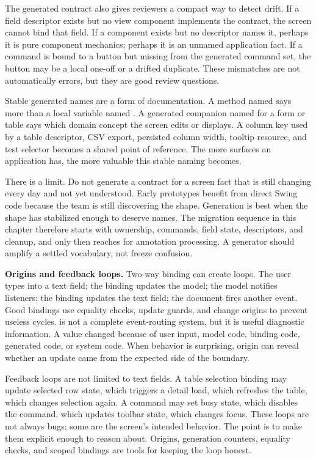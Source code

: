 The generated contract also gives reviewers a compact way to detect drift. If a field descriptor exists but no view component implements the contract, the screen cannot bind that field. If a component exists but no descriptor names it, perhaps it is pure component mechanics; perhaps it is an unnamed application fact. If a command is bound to a button but missing from the generated command set, the button may be a local one-off or a drifted duplicate. These mismatches are not automatically errors, but they are good review questions.

Stable generated names are a form of documentation. A method named  says more than a local variable named . A generated companion named for a form or table says which domain concept the screen edits or displays. A column key used by a table descriptor, CSV export, persisted column width, tooltip resource, and test selector becomes a shared point of reference. The more surfaces an application has, the more valuable this stable naming becomes.

There is a limit. Do not generate a contract for a screen fact that is still changing every day and not yet understood. Early prototypes benefit from direct Swing code because the team is still discovering the shape. Generation is best when the shape has stabilized enough to deserve names. The migration sequence in this chapter therefore starts with ownership, commands, field state, descriptors, and cleanup, and only then reaches for annotation processing. A generator should amplify a settled vocabulary, not freeze confusion.

\textbf{Origins and feedback loops.} Two-way binding can create loops. The user types into a text field; the binding updates the model; the model notifies listeners; the binding updates the text field; the document fires another event. Good bindings use equality checks, update guards, and change origins to prevent useless cycles.  is not a complete event-routing system, but it is useful diagnostic information. A value changed because of user input, model code, binding code, generated code, or system code. When behavior is surprising, origin can reveal whether an update came from the expected side of the boundary.

Feedback loops are not limited to text fields. A table selection binding may update selected row state, which triggers a detail load, which refreshes the table, which changes selection again. A command may set busy state, which disables the command, which updates toolbar state, which changes focus. These loops are not always bugs; some are the screen's intended behavior. The point is to make them explicit enough to reason about. Origins, generation counters, equality checks, and scoped bindings are tools for keeping the loop honest.

